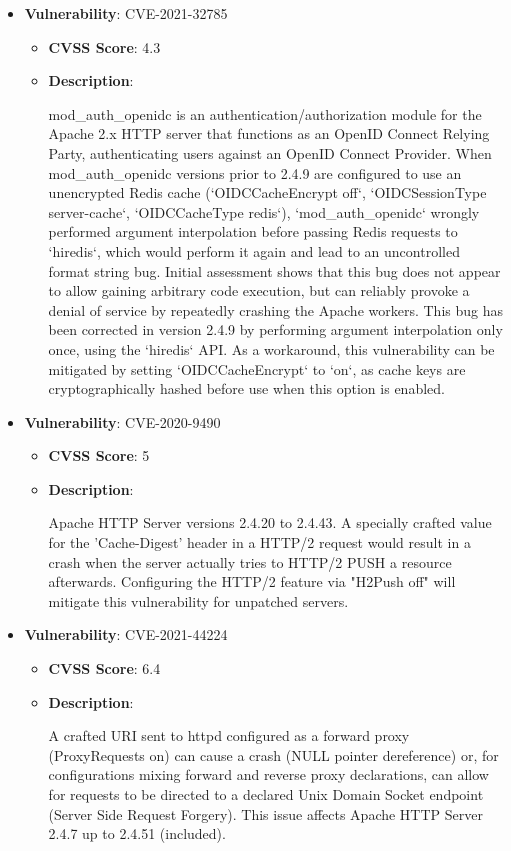 \documentclass{article}
\begin{document}
\begin{itemize}
        \item \textbf{Vulnerability}: CVE-2021-32785
        \begin{itemize}
            \item \textbf{CVSS Score}:  4.3 
            \item \textbf{Description}:
            \parbox[t]{0.9\linewidth}{
                \ttfamily mod\_auth\_openidc is an authentication/authorization module for the Apache 2.x HTTP server that functions as an OpenID Connect Relying Party, authenticating users against an OpenID Connect Provider. When mod\_auth\_openidc versions prior to 2.4.9 are configured to use an unencrypted Redis cache (`OIDCCacheEncrypt off`, `OIDCSessionType server-cache`, `OIDCCacheType redis`), `mod\_auth\_openidc` wrongly performed argument interpolation before passing Redis requests to `hiredis`, which would perform it again and lead to an uncontrolled format string bug. Initial assessment shows that this bug does not appear to allow gaining arbitrary code execution, but can reliably provoke a denial of service by repeatedly crashing the Apache workers. This bug has been corrected in version 2.4.9 by performing argument interpolation only once, using the `hiredis` API. As a workaround, this vulnerability can be mitigated by setting `OIDCCacheEncrypt` to `on`, as cache keys are cryptographically hashed before use when this option is enabled.
            }
        \end{itemize}
    
        \item \textbf{Vulnerability}: CVE-2020-9490
        \begin{itemize}
            \item \textbf{CVSS Score}:  5 
            \item \textbf{Description}:
            \parbox[t]{0.9\linewidth}{
                \ttfamily Apache HTTP Server versions 2.4.20 to 2.4.43. A specially crafted value for the 'Cache-Digest' header in a HTTP/2 request would result in a crash when the server actually tries to HTTP/2 PUSH a resource afterwards. Configuring the HTTP/2 feature via "H2Push off" will mitigate this vulnerability for unpatched servers.
            }
        \end{itemize}
    
        \item \textbf{Vulnerability}: CVE-2021-44224
        \begin{itemize}
            \item \textbf{CVSS Score}:  6.4 
            \item \textbf{Description}:
            \parbox[t]{0.9\linewidth}{
                \ttfamily A crafted URI sent to httpd configured as a forward proxy (ProxyRequests on) can cause a crash (NULL pointer dereference) or, for configurations mixing forward and reverse proxy declarations, can allow for requests to be directed to a declared Unix Domain Socket endpoint (Server Side Request Forgery). This issue affects Apache HTTP Server 2.4.7 up to 2.4.51 (included).
            }
        \end{itemize}
    

\end{itemize}
\end{document}
